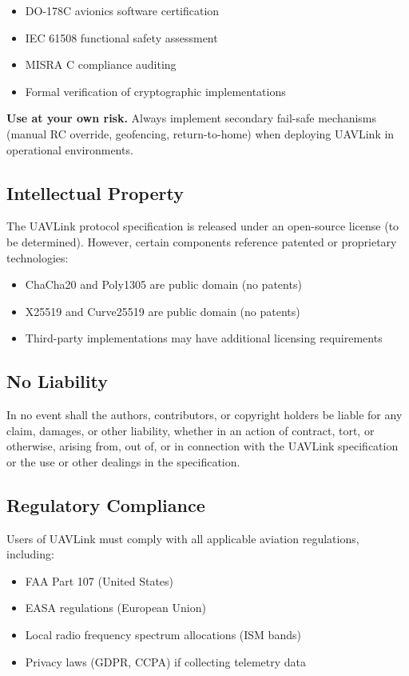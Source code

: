 \documentclass[11pt,a4paper]{article}
\begin{document}
\begin{itemize}[noitemsep]
\item DO-178C avionics software certification
\item IEC 61508 functional safety assessment
\item MISRA C compliance auditing
\item Formal verification of cryptographic implementations
\end{itemize}

\textbf{Use at your own risk.} Always implement secondary fail-safe mechanisms (manual RC override, geofencing, return-to-home) when deploying UAVLink in operational environments.

\subsection*{Intellectual Property}

The UAVLink protocol specification is released under an open-source license (to be determined). However, certain components reference patented or proprietary technologies:

\begin{itemize}[noitemsep]
\item ChaCha20 and Poly1305 are public domain (no patents)
\item X25519 and Curve25519 are public domain (no patents)
\item Third-party implementations may have additional licensing requirements
\end{itemize}

\subsection*{No Liability}

In no event shall the authors, contributors, or copyright holders be liable for any claim, damages, or other liability, whether in an action of contract, tort, or otherwise, arising from, out of, or in connection with the UAVLink specification or the use or other dealings in the specification.

\subsection*{Regulatory Compliance}

Users of UAVLink must comply with all applicable aviation regulations, including:

\begin{itemize}[noitemsep]
\item FAA Part 107 (United States)
\item EASA regulations (European Union)
\item Local radio frequency spectrum allocations (ISM bands)
\item Privacy laws (GDPR, CCPA) if collecting telemetry data
\end{itemize}
\end{document}
